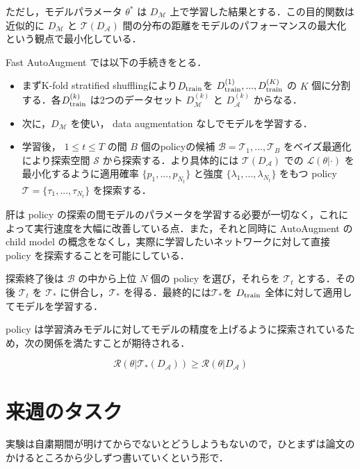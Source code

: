 \documentclass[onecolumn]{ujarticle}   %
\begin{document}
	ただし，モデルパラメータ $\theta^{*}$ は $D_{\mathcal{M}}$ 上で学習した結果とする．この目的関数は近似的に $D_{\mathcal{M}}$ と $\mathcal{T}(D_{\mathcal{A}})$ 間の分布の距離をモデルのパフォーマンスの最大化という観点で最小化している．

	Fast AutoAugment では以下の手続きをとる．

	\begin{itemize}
		\item まずK-fold stratified shufflingにより$D_{\rm{train}}$を $D^{(1)}_{\rm{train}}, ..., D^{(K)}_{\rm{train}}$ の $K$ 個に分割する．各$D^{(k)}_{\rm{train}}$ は2つのデータセット $D^{(k)}_{\mathcal{M}}$ と $D^{(k)}_{\mathcal{A}}$ からなる．
		\item 次に，$D_{\mathcal{M}}$ を使い， data augmentation なしでモデルを学習する．
		\item 学習後， $1 \leq t \leq T$ の間 $B$ 個のpolicyの候補 $\mathcal{B}={\mathcal{T}_{1}, ..., \mathcal{T}_{B}}$ をベイズ最適化により探索空間 $\mathcal{S}$ から探索する．より具体的には $\mathcal{T}(D_{\mathcal{A}})$ での $\mathcal{L}(\theta|\cdot)$ を最小化するように適用確率 $\{p_{1}, ..., p_{N_{t}}\}$ と強度 $\{\lambda_{1}, ..., \lambda_{N_{t}}\}$ をもつ policy $\mathcal{T} = \{ \tau_{1}, ..., \tau_{N_{t}} \}$ を探索する．
	\end{itemize}

	肝は policy の探索の間モデルのパラメータを学習する必要が一切なく，これによって実行速度を大幅に改善している点．また，それと同時に AutoAugment の child model の概念をなくし，実際に学習したいネットワークに対して直接 policy を探索することを可能にしている．

	探索終了後は $\mathcal{B}$ の中から上位 $N$ 個の policy を選び，それらを $\mathcal{T}_{t}$ とする．その後 $\mathcal{T}_{t}$ を $\mathcal{T}_{*}$ に併合し，$\mathcal{T}_{*}$ を得る．最終的には$\mathcal{T}_{*}$を $D_{\rm{train}}$ 全体に対して適用してモデルを学習する．

	policy は学習済みモデルに対してモデルの精度を上げるように探索されているため，次の関係を満たすことが期待される．

	\begin{equation*}
		\mathcal{R}(\theta|\mathcal{T}_{*}(D_{\mathcal{A}})) \geq \mathcal{R}(\theta|D_{\mathcal{A}})
	\end{equation*}

	\section{来週のタスク}
	実験は自粛期間が明けてからでないとどうしようもないので，ひとまずは論文のかけるところから少しずつ書いていくという形で．

	
	
\end{document}
